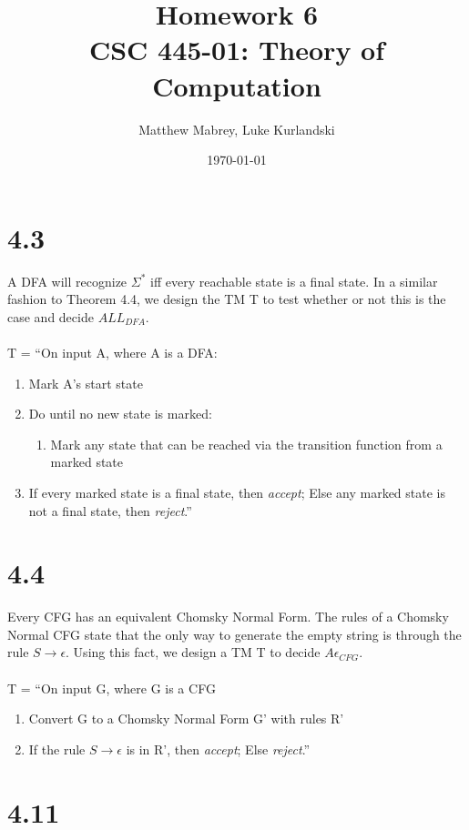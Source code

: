 \documentclass{article}
\title{Homework 6\\[0.2em]\smaller{}CSC 445-01: Theory of Computation}
\author{Matthew Mabrey, Luke Kurlandski}
\date{\today}
\begin{document}
\maketitle

\section*{4.3}

A DFA will recognize $\Sigma^*$ iff every reachable state is a final state. In a similar fashion to Theorem 4.4, we design the TM T to test whether or not this is the case and decide $ALL_{DFA}$.\\\\
T = ``On input A, where A is a DFA:
\begin{enumerate}
    \item Mark A's start state
    \item Do until no new state is marked:
    \begin{enumerate}
        \item Mark any state that can be reached via the transition function from a marked state
    \end{enumerate}
    \item If every marked state is a final state, then \textit{accept}; Else any marked state is not a final state, then \textit{reject}.''
\end{enumerate}

\section*{4.4}

Every CFG has an equivalent Chomsky Normal Form. The rules of a Chomsky Normal CFG state that the only way to generate the empty string is through the rule $S \rightarrow \epsilon$. Using this fact, we design a TM T to decide $A\epsilon_{CFG}$.\\\\
T = ``On input G, where G is a CFG
\begin{enumerate}
    \item Convert G to a Chomsky Normal Form G' with rules R'
    \item If the rule $S\rightarrow \epsilon$ is in R', then \textit{accept}; Else \textit{reject}.''
\end{enumerate}

\section*{4.11}
\end{document}
